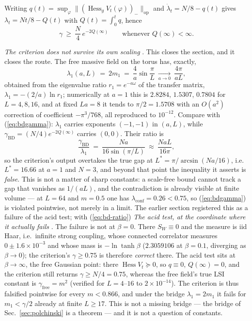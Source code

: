 Writing $q(t)=\sup_\varphi\lVert(\operatorname{Hess}_gV_t(\varphi))_-\rVert_{\mathrm{op}}$ and
$\dot\lambda_t=N/8-q(t)$ gives $\lambda_t=Nt/8-Q(t)$ with $Q(t)=\int_0^tq$, hence
\begin{equation}
\gamma\ \ge\ \frac N4\,e^{-2Q(\infty)} \qquad\text{whenever } Q(\infty)<\infty .
\label{eq:bdgamma}
\end{equation}

\emph{The criterion does not survive its own scaling} \LN. This closes the section, and it closes the
route. The free massive field on the torus has, exactly,
\begin{equation}
\lambda_1(a,L)\ =\ 2m_1\ =\ \frac4a\sin\frac{\pi}{L}\ \xrightarrow[a\to0]{}\ \frac{4\pi}{aL},
\label{eq:free-lambda}
\end{equation}
obtained from the eigenvalue ratio $r_1=e^{-a\omega}$ of the transfer matrix, $\lambda_1=-(2/a)\ln
r_1$; numerically at $a=1$ this is $2.8284$, $1.5307$, $0.7804$ for $L=4,8,16$, and at fixed $La=8$ it
tends to $\pi/2=1.5708$ with an $O(a^2)$ correction of coefficient $-\pi^3/768$, all reproduced to
$10^{-12}$. Compare with (\ref{eq:bdgamma}): $\lambda_1$ carries exponents $(-1,-1)$ in $(a,L)$, while
$\gamma_{\mathrm{BD}}=(N/4)e^{-2Q(\infty)}$ carries $(0,0)$. Their ratio is
\begin{equation}
\frac{\gamma_{\mathrm{BD}}}{\lambda_1}\ =\ \frac{Na}{16\sin(\pi/L)}\ \approx\ \frac{NaL}{16\pi},
\label{eq:bd-ratio}
\end{equation}
so the criterion's output overtakes the true gap at $L^*=\pi/\arcsin(Na/16)$, i.e.\ $L^*=16.66$ at
$a=1$ and $N=3$, and beyond that point the inequality it asserts is \emph{false}. This is not a
matter of sharp constants: a scale-free bound cannot track a gap that vanishes as $1/(aL)$, and the
contradiction is already visible at finite volume --- at $L=64$ and $m=0.5$ one has
$\lambda_{\mathrm{conf}}=0.26<0.75$, so (\ref{eq:bdgamma}) is violated pointwise, not merely in a
limit. The earlier section registered this as a failure of the acid test; with (\ref{eq:bd-ratio})
\emph{The acid test, at the coordinate where it actually fails} \LN. The failure is not at $\beta=0$.
There $S_W\equiv0$ and the measure is iid Haar, i.e.\ infinite strong coupling, whose connected
correlator measures $0\pm1.6\times10^{-3}$ and whose mass is $-\ln\tanh\beta$ ($2.3059106$ at
$\beta=0.1$, diverging as $\beta\to0$); the criterion's $\gamma\ge0.75$ is therefore \emph{correct}
there. The acid test sits at $\beta\to\infty$, the free Gaussian point: there
$\operatorname{Hess}V_t\succeq0$, so $q\equiv0$, $Q(\infty)=0$, and the criterion still returns
$\gamma\ge N/4=0.75$, whereas the free field's true LSI constant is $\gamma_{\mathrm{free}}=m^2$
(verified for $L=4$--$16$ to $2\times10^{-14}$). The criterion is thus falsified pointwise for every
$m<0.866$, and under the bridge $\lambda_1=2m_1$ it fails for $m_1<\gamma/2$ already at finite
$L\ge17$. This is not a missing bridge --- the bridge of Sec.~\ref{sec:polchinski} is a theorem --- and
it is not a question of constants.

